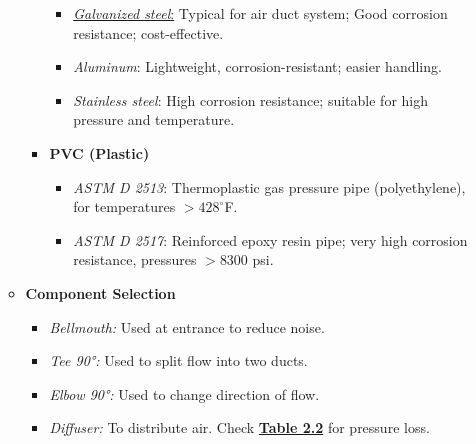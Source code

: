 \begin{multicols*}{2}
\begin{enumerate}
\begin{itemize}
\begin{itemize}
\begin{itemize}
                                      \item \underline{\textit{Galvanized steel}:} Typical for air duct system; Good corrosion resistance; cost-effective.
                                      \item \textit{Aluminum}: Lightweight, corrosion-resistant; easier handling.
                                      \item \textit{Stainless steel}: High corrosion resistance; suitable for high pressure and temperature.
                                  \end{itemize}
                            \item \textbf{PVC (Plastic)}
                                  \begin{itemize}
                                      \item \textit{ASTM D 2513}: Thermoplastic gas pressure pipe (polyethylene), for temperatures $> 428^\circ$F.
                                      \item \textit{ASTM D 2517}: Reinforced epoxy resin pipe; very high corrosion resistance, pressures $> 8300$ psi.
                                  \end{itemize}
                        \end{itemize}
                  \item \textbf{Component Selection}
                        \begin{itemize}
                            \item \textit{Bellmouth:} Used at entrance to reduce noise.
                            \item \textit{Tee 90°:} Used to split flow into two ducts.
                            \item \textit{Elbow 90°:} Used to change direction of flow.
                            \item \textit{Diffuser:} To distribute air. Check \underline{\textbf{Table 2.2}} for pressure loss.
                        \end{itemize}
              \end{itemize}


\end{enumerate}
\end{multicols*}

